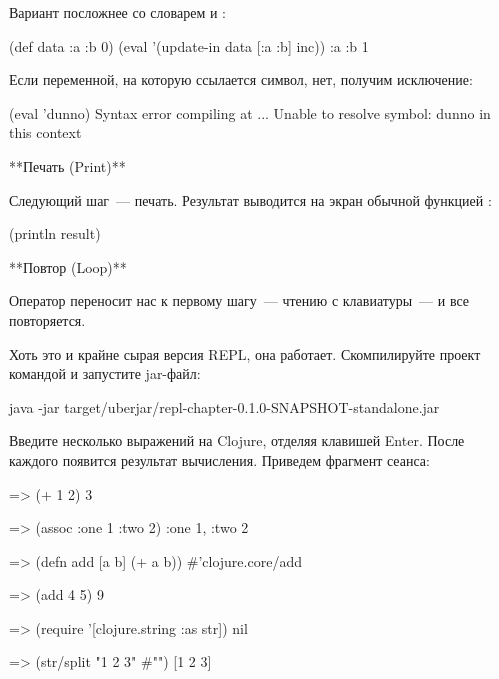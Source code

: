Вариант посложнее со словарем и :

\begin{english}
  \begin{clojure}
(def data {:a {:b 0}})
(eval '(update-in data [:a :b] inc))
{:a {:b 1}}
  \end{clojure}
\end{english}

Если переменной, на которую ссылается символ, нет, получим исключение:

\begin{english}
  \begin{clojure}
(eval 'dunno)
Syntax error compiling at ...
Unable to resolve symbol: dunno in this context
  \end{clojure}
\end{english}

**Печать (Print)**

Следующий шаг~--- печать. Результат  выводится на экран обычной функцией :

\begin{english}
  \begin{clojure}
(println result)
  \end{clojure}
\end{english}

**Повтор (Loop)**

Оператор  переносит нас к первому шагу~--- чтению с клавиатуры~--- и все повторяется.

Хоть это и крайне сырая версия REPL, она работает. Скомпилируйте проект командой  и запустите jar-файл:

\begin{english}
  \begin{clojure}
java -jar target/uberjar/repl-chapter-0.1.0-SNAPSHOT-standalone.jar
  \end{clojure}
\end{english}

Введите несколько выражений на Clojure, отделяя клавишей Enter. После каждого появится результат вычисления. Приведем фрагмент сеанса:

\begin{english}
  \begin{clojure}
=> (+ 1 2)
3

=> (assoc {:one 1} :two 2)
{:one 1, :two 2}

=> (defn add [a b] (+ a b))
#'clojure.core/add

=> (add 4 5)
9

=> (require '[clojure.string :as str])
nil

=> (str/split "1 2 3" #"\s")
[1 2 3]
  \end{clojure}
\end{english}

